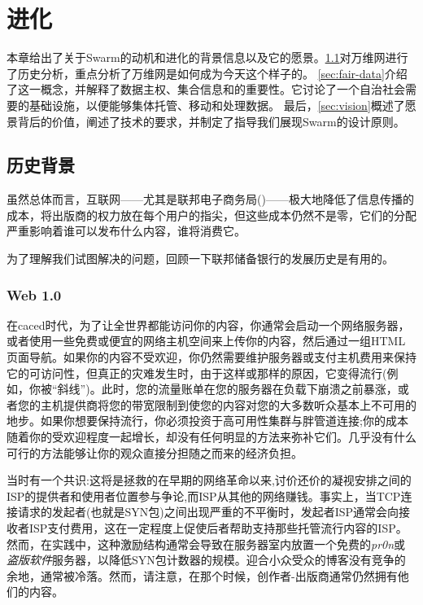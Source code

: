 \chapter{进化\statusgreen}\label{chap:vision}



本章给出了关于Swarm的动机和进化的背景信息以及它的愿景。\ref{sec:historical_context}对万维网进行了历史分析，重点分析了万维网是如何成为今天这个样子的。
\ref{sec:fair-data}介绍了这一概念，并解释了数据主权、集合信息和的重要性。它讨论了一个自治社会需要的基础设施，以便能够集体托管、移动和处理数据。
最后，\ref{sec:vision}概述了愿景背后的价值，阐述了技术的要求，并制定了指导我们展现Swarm的设计原则。

\section{历史背景\statusgreen}\label{sec:historical_context}
\green{}
虽然总体而言，互联网——尤其是联邦电子商务局()——极大地降低了信息传播的成本，将出版商的权力放在每个用户的指尖，但这些成本仍然不是零，它们的分配严重影响着谁可以发布什么内容，谁将消费它。

为了理解我们试图解决的问题，回顾一下联邦储备银行的发展历史是有用的。

\subsection{Web 1.0 \statusgreen}\label{sec:web_1}

在caced时代，为了让全世界都能访问你的内容，你通常会启动一个网络服务器，或者使用一些免费或便宜的网络主机空间来上传你的内容，然后通过一组HTML页面导航。如果你的内容不受欢迎，你仍然需要维护服务器或支付主机费用来保持它的可访问性，但真正的灾难发生时，由于这样或那样的原因，它变得流行(例如，你被“斜线”)。此时，您的流量账单在您的服务器在负载下崩溃之前暴涨，或者您的主机提供商将您的带宽限制到使您的内容对您的大多数听众基本上不可用的地步。如果你想要保持流行，你必须投资于高可用性集群与胖管道连接;你的成本随着你的受欢迎程度一起增长，却没有任何明显的方法来弥补它们。几乎没有什么可行的方法能够让你的观众直接分担随之而来的经济负担。

当时有一个共识:这将是拯救的在早期的网络革命以来,讨价还价的凝视安排之间的ISP的提供者和使用者位置参与争论,而ISP从其他的网络赚钱。事实上，当TCP连接请求的发起者(也就是SYN包)之间出现严重的不平衡时，发起者ISP通常会向接收者ISP支付费用，这在一定程度上促使后者帮助支持那些托管流行内容的ISP。然而，在实践中，这种激励结构通常会导致在服务器室内放置一个免费的\emph{pr0n}或\emph{盗版软件}服务器，以降低SYN包计数器的规模。迎合小众受众的博客没有竞争的余地，通常被冷落。然而，请注意，在那个时候，创作者-出版商通常仍然拥有他们的内容。

